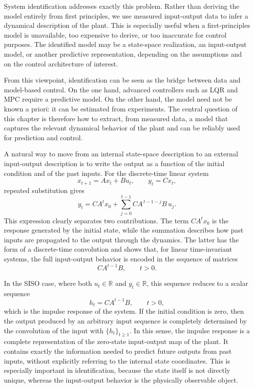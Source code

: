 System identification addresses exactly this problem. Rather than deriving the model entirely from first principles, we use measured input-output data to infer a dynamical description of the plant. This is especially useful when a first-principles model is unavailable, too expensive to derive, or too inaccurate for control purposes. The identified model may be a state-space realization, an input-output model, or another predictive representation, depending on the assumptions and on the control architecture of interest.

From this viewpoint, identification can be seen as the bridge between data and model-based control. On the one hand, advanced controllers such as LQR and MPC require a predictive model. On the other hand, the model need not be known a priori: it can be estimated from experiments. The central question of this chapter is therefore how to extract, from measured data, a model that captures the relevant dynamical behavior of the plant and can be reliably used for prediction and control.

A natural way to move from an internal state-space description to an external input-output description is to write the output as a function of the initial condition and of the past inputs. For the discrete-time linear system
\[
x_{t+1}=Ax_t+Bu_t,\qquad y_t=Cx_t,
\]
repeated substitution gives
\[
y_t = CA^t x_0 + \sum_{j=0}^{t-1} CA^{\,t-1-j} B\,u_j.
\]
This expression clearly separates two contributions. The term \(CA^t x_0\) is the response generated by the initial state, while the summation describes how past inputs are propagated to the output through the dynamics. The latter has the form of a discrete-time convolution and shows that, for linear time-invariant systems, the full input-output behavior is encoded in the sequence of matrices
\[
CA^{t-1}B,\qquad t>0.
\]

In the SISO case, where both \(u_t\in\mathbb{R}\) and \(y_t\in\mathbb{R}\), this sequence reduces to a scalar sequence
\[
h_t = CA^{t-1}B,\qquad t>0,
\]
which is the impulse response of the system. If the initial condition is zero, then the output produced by an arbitrary input sequence is completely determined by the convolution of the input with \(\{h_t\}_{t\geq 1}\). In this sense, the impulse response is a complete representation of the zero-state input-output map of the plant. It contains exactly the information needed to predict future outputs from past inputs, without explicitly referring to the internal state coordinates. This is especially important in identification, because the state itself is not directly unique, whereas the input-output behavior is the physically observable object.

